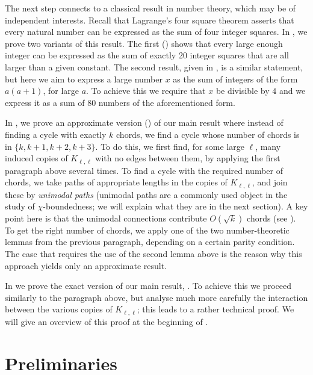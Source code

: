 \documentclass[11pt,english]{article}
\theoremstyle{plain}
\theoremstyle{definition}
\theoremstyle{remark}
\begin{document}
    The next step connects to a classical result in number theory, which may be of independent interests.
    Recall that Lagrange's four square theorem asserts that every natural number can be expressed as the sum of four integer squares. 
    In , we prove two variants of this result. The first () shows that every large enough integer can be expressed as the sum of exactly 20 integer squares that are all larger than a given constant. The second result, given in , is a similar statement, but here we aim to express a large number $x$ as the sum of integers of the form $a(a+1)$, for large $a$. To achieve this we require that $x$ be divisible by $4$ and we express it as a sum of 80 numbers of the aforementioned form.
    
    In , we prove an approximate version () of our main result where instead of finding a cycle with exactly $k$ chords, we find a cycle whose number of chords is in $\{k, k+1, k+2, k+3\}$. To do this, we first find, for some large $\ell$, many induced copies of $K_{\ell, \ell}$ with no edges between them, by applying the first paragraph above several times. To find a cycle with the required number of chords, we take paths of appropriate lengths in the copies of $K_{\ell, \ell}$, and join these by \emph{unimodal paths} (unimodal paths are a commonly used object in the study of $\chi$-boundedness; we will explain what they are in the next section). A key point here is that the unimodal connections contribute $O(\sqrt{k})$ chords (see ). To get the right number of chords, we apply one of the two number-theoretic lemmas from the previous paragraph, depending on a certain parity condition. The case that requires the use of the second lemma above is the reason why this approach yields only an approximate result.
    
    In  we prove the exact version of our main result, . To achieve this we proceed similarly to the paragraph above, but analyse much more carefully the interaction between the various copies of $K_{\ell, \ell}$; this leads to a rather technical proof. We will give an overview of this proof at the beginning of .
	

\section{Preliminaries} \label{sec:prelim}
\end{document}
